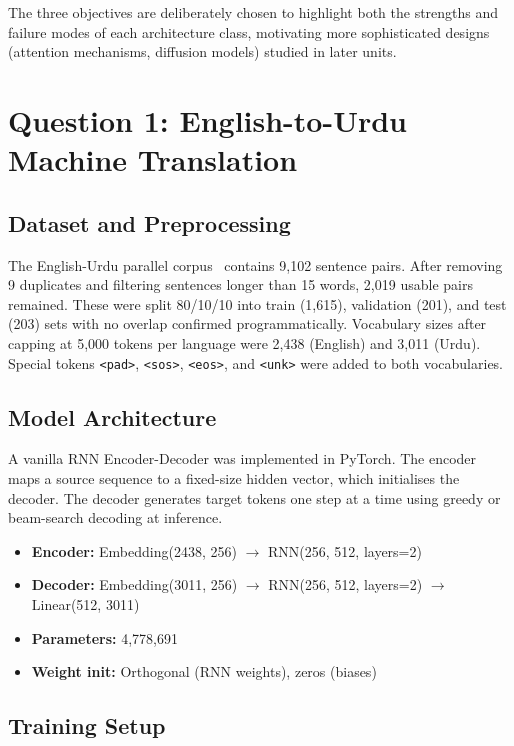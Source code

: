 \documentclass[runningheads]{llncs}
\begin{document}
The three objectives are deliberately chosen to highlight both the
strengths and failure modes of each architecture class, motivating
more sophisticated designs (attention mechanisms, diffusion models)
studied in later units.

\section{Question 1: English-to-Urdu Machine Translation}

\subsection{Dataset and Preprocessing}

The English-Urdu parallel corpus~\cite{kaggle_urdu} contains 9,102
sentence pairs. After removing 9 duplicates and filtering sentences
longer than 15 words, 2,019 usable pairs remained. These were split
80/10/10 into train (1,615), validation (201), and test (203) sets
with no overlap confirmed programmatically. Vocabulary sizes after
capping at 5,000 tokens per language were 2,438 (English) and 3,011
(Urdu). Special tokens \texttt{<pad>}, \texttt{<sos>}, \texttt{<eos>},
and \texttt{<unk>} were added to both vocabularies.

\subsection{Model Architecture}

A vanilla RNN Encoder-Decoder was implemented in PyTorch. The encoder
maps a source sequence to a fixed-size hidden vector, which initialises
the decoder. The decoder generates target tokens one step at a time
using greedy or beam-search decoding at inference.

\begin{itemize}
    \item \textbf{Encoder:} Embedding(2438, 256) $\rightarrow$ RNN(256, 512, layers=2)
    \item \textbf{Decoder:} Embedding(3011, 256) $\rightarrow$ RNN(256, 512, layers=2) $\rightarrow$ Linear(512, 3011)
    \item \textbf{Parameters:} 4,778,691
    \item \textbf{Weight init:} Orthogonal (RNN weights), zeros (biases)
\end{itemize}

\subsection{Training Setup}
\end{document}
